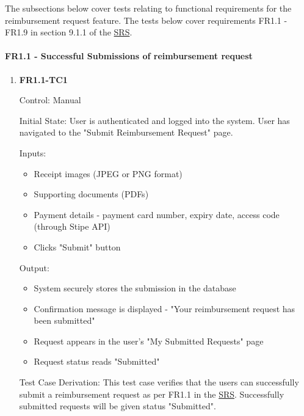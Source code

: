 \documentclass[12pt, titlepage]{article}
\begin{document}
The subsections below cover tests relating to functional requirements for the reimbursement request feature. The tests below cover requirements FR1.1 - FR1.9 in section 9.1.1 of the \href{https://shorturl.at/FdAgR}{SRS}. 
		
\paragraph{FR1.1 - Successful Submissions of reimbursement request}

\begin{enumerate}

\item{\textbf{FR1.1-TC1}\\}

Control: Manual
					
Initial State: User is authenticated and logged into the system. User has navigated to the "Submit Reimbursement Request" page.
					
Inputs:
\begin{itemize}
    \item Receipt images (JPEG or PNG format)
    \item Supporting documents (PDFs)
    \item Payment details - payment card number, expiry date, access code (through Stipe API)
    \item Clicks "Submit" button
\end{itemize}
					
Output: 
\begin{itemize}
    \item System securely stores the submission in the database
    \item Confirmation message is displayed - "Your reimbursement request has been submitted"
    \item Request appears in the user's "My Submitted Requests" page
    \item Request status reads "Submitted"
\end{itemize}

Test Case Derivation: This test case verifies that the users can successfully submit a reimbursement request as per FR1.1 in the \href{https://shorturl.at/FdAgR}{SRS}. Successfully submitted requests will be given status "Submitted".
					

\end{enumerate}
\end{document}
